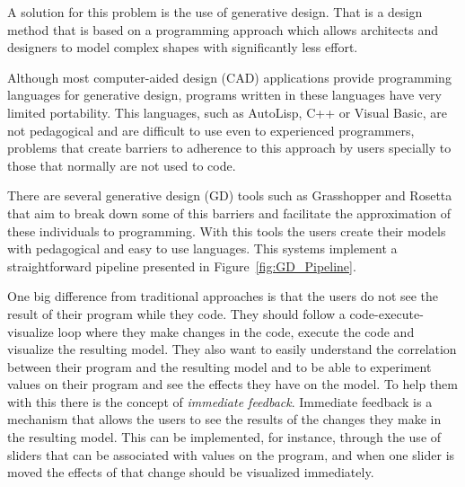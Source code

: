 A solution for this problem is the use of generative design. That is a design method that is based on a programming approach which allows architects and designers to model complex shapes with significantly less effort. 

Although most computer-aided design (CAD) applications provide programming languages for generative design, programs written in these languages have very limited portability. This languages, such as AutoLisp, C++ or Visual Basic, are not pedagogical and are difficult to use even to experienced programmers, problems that create barriers to adherence to this approach by users specially to those that normally are not used to code.\cite{ramos_et_al:OASIcs:2014:4565}

There are several generative design (GD) tools such as Grasshopper and Rosetta that aim to break down some of this barriers and facilitate the approximation of these individuals to programming. With this tools the users create their models with pedagogical and easy to use languages. This systems implement a straightforward pipeline presented in Figure~\ref{fig:GD_Pipeline}. 

One big difference from traditional approaches is that the users do not see the result of their program while they code. They should follow a code-execute-visualize loop where they make changes in the code, execute the code and visualize the resulting model. They also want to easily understand the correlation between their program and the resulting model and to be able to experiment values on their program and see the effects they have on the model. To help them with this there is the concept of \emph{immediate feedback}. Immediate feedback is a mechanism that allows the users to see the results of the changes they make in the resulting model. This can be implemented, for instance, through the use of sliders that can be associated with values on the program, and when one slider is moved the effects of that change should be visualized immediately. 


